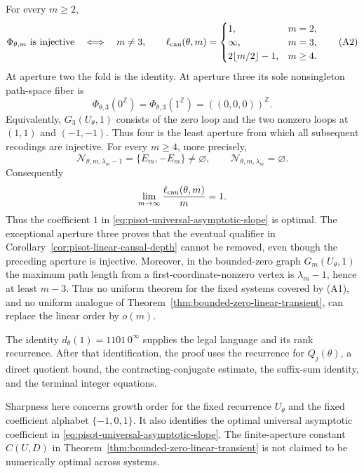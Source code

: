 \begin{theorem}
\label{thm:fixed-cubic-sharpness}
For every $m\ge2$,
\begin{equation*}
\Phi_{\theta,m}\text{ is injective}
\quad\Longleftrightarrow\quad m\ne3,
\qquad
\ell_{\rm cau}(\theta,m)=
\begin{cases}
1,&m=2,\\
\infty,&m=3,\\
2\lfloor m/2\rfloor-1,&m\ge4.
\end{cases}
\tag{A2}\label{eq:pisot-linear-A2}
\end{equation*}
At aperture two the fold is the identity.  At aperture three its sole
nonsingleton path-space fiber is
\[
\Phi_{\theta,3}(0^{\mathbb Z})
=\Phi_{\theta,3}(1^{\mathbb Z})
=((0,0,0))^{\mathbb Z}.
\]
Equivalently, $G_3(U_\theta,1)$ consists of the zero loop and the two nonzero
loops at $(1,1)$ and $(-1,-1)$.  Thus four is the least aperture from which
all subsequent recodings are injective.
For every $m\ge4$, more precisely,
\begin{equation*}
\mathcal N_{\theta,m,\lambda_m-1}=\{E_m,-E_m\}\ne\varnothing,
\qquad
\mathcal N_{\theta,m,\lambda_m}=\varnothing.
\tag{A3}\label{eq:pisot-linear-A3}
\end{equation*}
Consequently
\[
\lim_{m\to\infty}\frac{\ell_{\rm cau}(\theta,m)}m=1.
\]
Thus the coefficient $1$ in
\eqref{eq:pisot-universal-asymptotic-slope} is optimal.
The exceptional aperture three proves that the eventual qualifier in
Corollary~\ref{cor:pisot-linear-causal-depth} cannot be removed, even though
the preceding aperture is injective.
Moreover, in the bounded-zero graph $G_m(U_\theta,1)$ the maximum path
length from a first-coordinate-nonzero vertex is $\lambda_m-1$, hence at
least $m-3$.  Thus no uniform theorem for the fixed systems covered by
\textup{(A1)}, and no uniform analogue of
Theorem~\ref{thm:bounded-zero-linear-transient}, can replace the linear order
by $o(m)$.
\end{theorem}

\begin{remark}
The identity $d_\theta(1)=1101\,0^\infty$ supplies the legal language and its
rank recurrence.  After that identification, the proof uses the recurrence
for $Q_j(\theta)$, a direct quotient bound, the contracting-conjugate
estimate, the suffix-sum identity, and the terminal integer equations.
\end{remark}

\begin{remark}
Sharpness here concerns growth order for the fixed recurrence $U_\theta$ and
the fixed coefficient alphabet $\{-1,0,1\}$.  It also identifies the optimal
universal asymptotic coefficient in
\eqref{eq:pisot-universal-asymptotic-slope}.  The finite-aperture constant
$C(U,D)$ in Theorem~\ref{thm:bounded-zero-linear-transient} is not claimed to
be numerically optimal across systems.
\end{remark}

